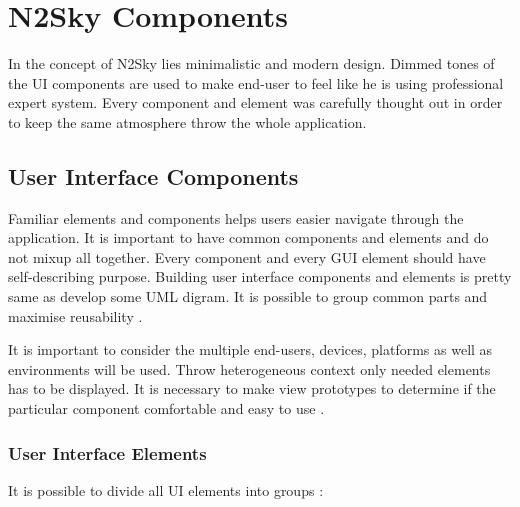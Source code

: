 \section{N2Sky Components}\label{N2Sky Components}

In the concept of N2Sky lies minimalistic and modern design. Dimmed tones of the UI components are used to make end-user to feel like he is using professional expert system. Every component and element was carefully thought out in order to keep the same atmosphere throw the whole application. 

\subsection{User Interface Components}\label{User Interface Components}

Familiar elements and components helps users easier navigate through the application. It is important to have common components and elements and do not mixup all together. Every component and every GUI element should have self-describing purpose. Building user interface components and elements is pretty same as develop some UML digram. It is possible to group common parts and maximise reusability \cite{mod_ui_book}. 

It is important to consider the multiple end-users, devices, platforms as well as environments will be used. Throw heterogeneous context only needed elements has to be displayed. It is necessary to make view prototypes to determine if the particular component comfortable and easy to use \cite{Martinez2017}. 

\subsubsection{User Interface Elements}\label{User Interface Elements}

It is possible to divide all UI elements into groups \cite{intelligent_support}:


